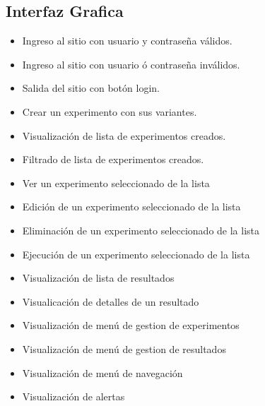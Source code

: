 \subsection{Interfaz Grafica}
\begin{itemize}
\item Ingreso al sitio con usuario y contrase\~na v\'alidos.
\item Ingreso al sitio con usuario ó contrase\~na inv\'alidos.
\item Salida del sitio con bot\'on login.

\item Crear un experimento con sus variantes.

\item Visualizaci\'on de lista de experimentos creados.
\item Filtrado de lista de experimentos creados.

\item Ver un experimento seleccionado de la lista
\item Edici\'on de un experimento seleccionado de la lista
\item Eliminaci\'on de un experimento seleccionado de la lista
\item Ejecuci\'on de un experimento seleccionado de la lista

\item Visualizaci\'on de lista de resultados
\item Visualicaci\'on de detalles de un resultado
\item Visualizaci\'on de men\'u de gestion de experimentos
\item Visualizaci\'on de men\'u de gestion de resultados
\item Visualizaci\'on de men\'u de navegaci\'on
\item Visualizaci\'on de alertas
\end{itemize}
\newpage